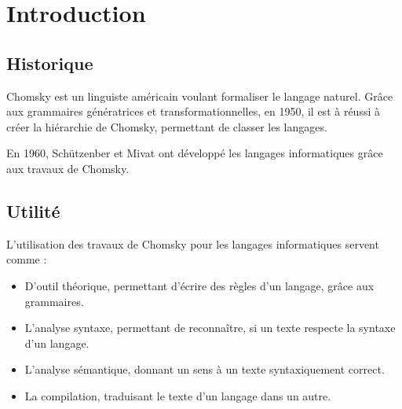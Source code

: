 \chapter{Introduction} %
\label{cha:introduction}


\section{Historique} %
\label{sec:historique}

Chomsky est un linguiste américain voulant formaliser le langage naturel. Grâce aux grammaires génératrices et transformationnelles, en 1950, il est à réussi à créer la hiérarchie de Chomsky, permettant de classer les langages.

En 1960, Schützenber et Mivat ont développé les langages informatiques grâce aux travaux de Chomsky.



\section{Utilité} %
\label{sec:utilit_}

L'utilisation des travaux de Chomsky pour les langages informatiques servent comme :
\begin{itemize}
	\item D'outil théorique, permettant d'écrire des règles d'un langage, grâce aux grammaires.
	\item L'analyse syntaxe, permettant de reconnaître, si un texte respecte la syntaxe d'un langage.
	\item L'analyse sémantique, donnant un sens à un texte syntaxiquement correct.
	\item La compilation, traduisant le texte d'un langage dans un autre.
\end{itemize}



